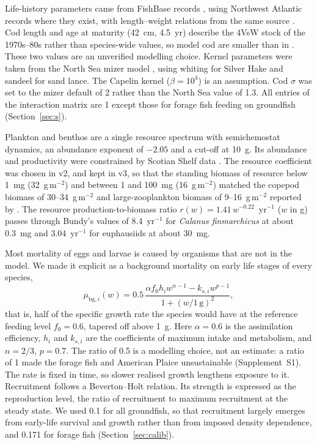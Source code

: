\documentclass[12pt,letterpaper,fleqn]{article}
\newcommand{\yr}{yr$^{-1}$}
\newcommand{\gm}{g\,m$^{-2}$}
\begin{document}
Life-history parameters came from FishBase records \autocite{froese2026fishbase}, using Northwest Atlantic records where they exist, with length--weight relations from the same source \autocite{froese2014bayesian}. Cod length and age at maturity (42~cm, 4.5~yr) describe the 4VsW stock of the 1970s--80s rather than species-wide values, so model cod are smaller than in \textcite{adekoya2026reexamining}. These two values are an unverified modelling choice. Kernel parameters were taken from the North Sea mizer model \autocite{blanchard2014evaluating}, using whiting for Silver Hake and sandeel for sand lance. The Capelin kernel ($\beta=10^{4}$) is an assumption. Cod $\sigma$ was set to the mizer default of 2 rather than the North Sea value of 1.3. All entries of the interaction matrix are 1 except those for forage fish feeding on groundfish (Section~\ref{sec:s}).

Plankton and benthos are a single resource spectrum with semichemostat dynamics, an abundance exponent of $-2.05$ and a cut-off at 10~g. Its abundance and productivity were constrained by Scotian Shelf data \autocite{bundy2004mass}. The resource coefficient was chosen in v2, and kept in v3, so that the standing biomass of resource below 1~mg (32~\gm) and between 1 and 100~mg (16~\gm) matched the copepod biomass of 30--34~\gm{} and large-zooplankton biomass of 9--16~\gm{} reported by \textcite{bundy2004mass}. The resource production-to-biomass ratio $r(w)=1.41\,w^{-0.22}$~\yr{} ($w$ in g) passes through Bundy's values of 8.4~\yr{} for \textit{Calanus finmarchicus} at about 0.3~mg and 3.04~\yr{} for euphausiids at about 30~mg.

Most mortality of eggs and larvae is caused by organisms that are not in the model. We made it explicit as a background mortality on early life stages of every species,
\begin{equation}
\mu_{\mathrm{bg},i}(w)=0.5\,\frac{\alpha f_0 h_i w^{n-1}-k_{s,i}w^{p-1}}{1+(w/1\,\mathrm{g})^{2}},
\label{eq:bg}
\end{equation}
that is, half of the specific growth rate the species would have at the reference feeding level $f_0=0.6$, tapered off above 1~g. Here $\alpha=0.6$ is the assimilation efficiency, $h_i$ and $k_{s,i}$ are the coefficients of maximum intake and metabolism, and $n=2/3$, $p=0.7$. The ratio of 0.5 is a modelling choice, not an estimate: a ratio of 1 made the forage fish and American Plaice unsustainable (Supplement~S1). The rate is fixed in time, so slower realised growth lengthens exposure to it. Recruitment follows a Beverton--Holt relation. Its strength is expressed as the reproduction level, the ratio of recruitment to maximum recruitment at the steady state. We used 0.1 for all groundfish, so that recruitment largely emerges from early-life survival and growth rather than from imposed density dependence, and 0.171 for forage fish (Section~\ref{sec:calib}).
\end{document}
